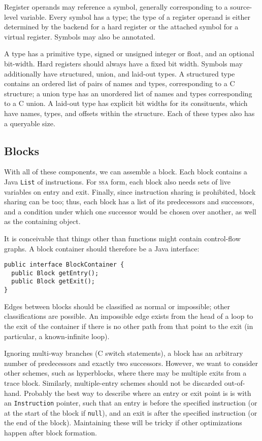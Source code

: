 \documentclass[11pt]{article}
\def\class#1{\texttt{#1}}
\def\ssa{\textsc{ssa}}
\begin{document}
Register operands may reference a symbol, generally corresponding to a
source-level variable.  Every symbol has a type; the type of a
register operand is either determined by the backend for a hard
register or the attached symbol for a virtual register.  Symbols may
also be annotated.

A type has a primitive type, signed or unsigned integer or float, and
an optional bit-width.  Hard registers should always have a fixed bit
width.  Symbols may additionally have structured, union, and laid-out
types.  A structured type contains an ordered list of pairs of names
and types, corresponding to a C structure; a union type has an
unordered list of names and types corresponding to a C union.  A
laid-out type has explicit bit widths for its consituents, which have
names, types, and offsets within the structure.  Each of these types
also has a queryable size.

\subsection{Blocks}

With all of these components, we can assemble a block.  Each block
contains a Java \class{List} of instructions.  For \ssa{} form, each
block also needs sets of live variables on entry and exit.  Finally,
since instruction sharing is prohibited, block sharing can be too;
thus, each block has a list of its predecessors and successors, and a
condition under which one successor would be chosen over another, as
well as the containing object.

It is conceivable that things other than functions might contain
control-flow graphs.  A block container should therefore be a Java
interface:

\begin{verbatim}
public interface BlockContainer {
  public Block getEntry();
  public Block getExit();
}
\end{verbatim}

Edges between blocks should be classified as normal or impossible;
other classifications are possible.  An impossible edge exists from
the head of a loop to the exit of the container if there is no other
path from that point to the exit (in particular, a known-infinite
loop).

Ignoring multi-way branches (C switch statements), a block has an
arbitrary number of predecessors and exactly two successors.  However,
we want to consider other schemes, such as hyperblocks, where there
may be multiple exits from a trace block.  Similarly, multiple-entry
schemes should not be discarded out-of-hand.  Probably the best way to
describe where an entry or exit point is is with an
\class{Instruction} pointer, such that an entry is before the
specified instruction (or at the start of the block if \texttt{null}),
and an exit is after the specified instruction (or the end of the
block).  Maintaining these will be tricky if other optimizations
happen after block formation.
\end{document}
